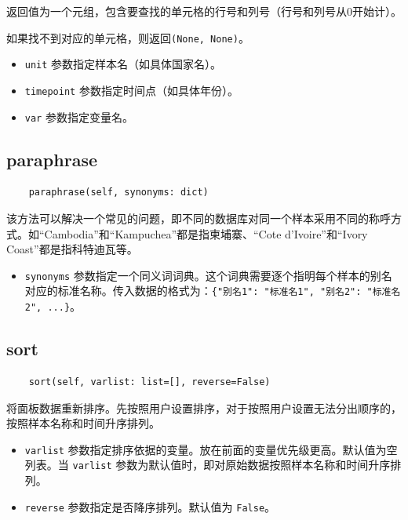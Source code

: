 \documentclass[a4paper, UTF8, fontset=none]{ctexart}
\begin{document}
    返回值为一个元组，包含要查找的单元格的行号和列号（行号和列号从0开始计）。

    如果找不到对应的单元格，则返回\verb|(None, None)|。

    \begin{itemize}
        \item \verb|unit| 参数指定样本名（如具体国家名）。
        \item \verb|timepoint| 参数指定时间点（如具体年份）。
        \item \verb|var| 参数指定变量名。
    \end{itemize}

\subsection{paraphrase\label{paraphrase}}

    \begin{lstlisting}
    paraphrase(self, synonyms: dict)
    \end{lstlisting}    

    该方法可以解决一个常见的问题，即不同的数据库对同一个样本采用不同的称呼方式。如“Cambodia”和“Kampuchea”都是指柬埔寨、“Cote d'Ivoire”和“Ivory Coast”都是指科特迪瓦等。

    \begin{itemize}
        \item \verb|synonyms| 参数指定一个同义词词典。这个词典需要逐个指明每个样本的别名对应的标准名称。传入数据的格式为：\verb|{"别名1": "标准名1", "别名2": "标准名2", ...}|。
    \end{itemize}

\subsection{sort}

    \begin{lstlisting}
    sort(self, varlist: list=[], reverse=False)
    \end{lstlisting}

    将面板数据重新排序。先按照用户设置排序，对于按照用户设置无法分出顺序的，按照样本名称和时间升序排列。

    \begin{itemize}
        \item \verb|varlist| 参数指定排序依据的变量。放在前面的变量优先级更高。默认值为空列表。当 \verb|varlist| 参数为默认值时，即对原始数据按照样本名称和时间升序排列。
        \item \verb|reverse| 参数指定是否降序排列。默认值为  \verb|False|。
    \end{itemize} 
\end{document}
